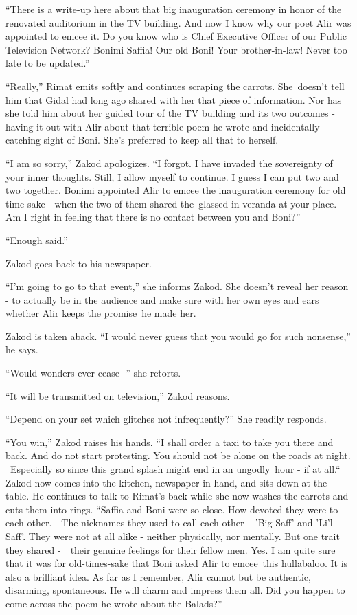\documentclass[twoside,11pt]{book}
\begin{document}
``There is a write-up here about that big inauguration ceremony in honor of the renovated auditorium in the
TV building. And now I know why our poet Alir was appointed to emcee it. Do you know who is Chief Executive Officer of
our Public Television Network? Bonimi Saffia! Our old Boni! Your brother-in-law! Never too late to be
updated.'' 

``Really,'' Rimat emits softly and continues scraping the carrots. She~doesn't tell him that
Gidal had long ago shared with her that piece of information. Nor has she told him about her guided tour of the TV
building and its two outcomes - having it out with Alir about that terrible poem he wrote and incidentally catching
sight of Boni. She{}'s preferred to keep all that to herself. ~

``I am so sorry,'' Zakod apologizes. ``I forgot. I have invaded the sovereignty
of your inner thoughts. Still, I allow myself to continue. I guess I can put two and two together. Bonimi appointed
Alir to emcee the inauguration ceremony for old time sake - when the two of them shared the\ glassed-in veranda at your
place. Am I right in feeling that there is no contact between you and Boni?''

``Enough said.'' 

Zakod goes back to his newspaper. 

``I'm going to go to that event,'' she informs Zakod. She doesn't reveal her reason - to
actually be in the audience and make sure with her own eyes and ears whether Alir keeps  the promise\ he made 
her.{\ }

Zakod is taken aback. ``I would never guess that you would go for such nonsense,'' he says.

``Would wonders ever cease -'' she retorts.

``It will be transmitted on television,'' Zakod reasons.

``Depend on your set which glitches not infrequently?'' She readily responds.\ 

``You win,'' Zakod raises his hands. ``I shall order a taxi to take you there and
back. And do not start protesting. You should not be alone on the roads at night. ~Especially so since this grand
splash might end in an ungodly\ hour - if at all.``~ Zakod now comes into the kitchen, newspaper in hand,
and sits down at the table. He continues to talk to Rimat's back while she now washes the carrots and cuts them into
rings. ``Saffia and Boni were so close.  How devoted they were to each other{.}\ \ The
nicknames they used to call each other -- 'Big-Saff' and 'Li'l-Saff'. They were not at all alike - neither physically,
nor mentally. But one trait they shared -~{\ }their genuine feelings for their
fellow men. Yes. I am quite sure that it was for old-times-sake that Boni asked Alir to emcee~this hullabaloo. It is
also a brilliant idea. As far as I remember, Alir cannot but be authentic, disarming, spontaneous. He will charm and
impress them all. Did you happen to come across the poem he wrote about the Balads?''
\end{document}
